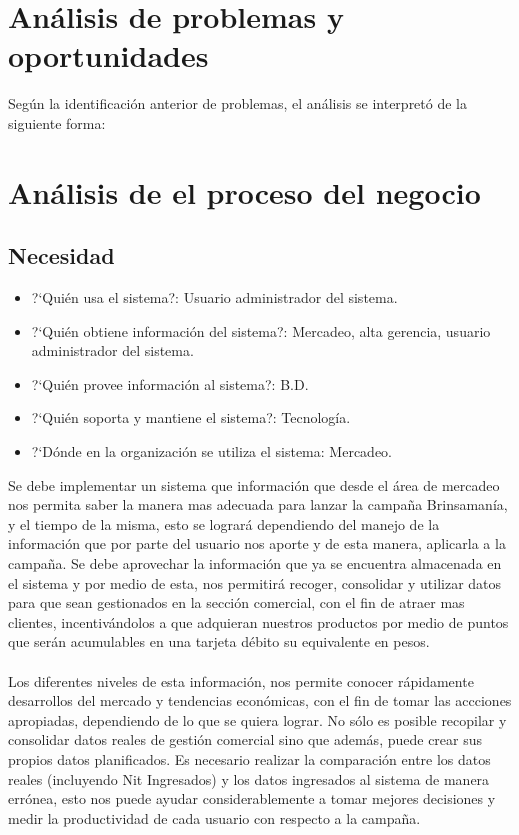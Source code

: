 \section{An\'alisis de problemas y oportunidades}
Seg\'un la identificaci\'on anterior de problemas, el an\'alisis se interpret\'o de la siguiente forma:%
%
%
\section{An\'alisis de el proceso del negocio}
\subsection{Necesidad}
\begin{itemize}
	\item ?`Qui\'en usa el sistema?: Usuario administrador del sistema.
	\item ?`Qui\'en obtiene informaci\'on del sistema?: Mercadeo, alta gerencia, usuario administrador del sistema.
	\item ?`Qui\'en provee informaci\'on al sistema?: B.D.
	\item ?`Qui\'en soporta y mantiene el sistema?: Tecnolog\'ia.
	\item ?`D\'onde en la organizaci\'on se utiliza el sistema: Mercadeo.
\end{itemize}%
%
Se debe implementar un sistema que informaci\'on que desde el \'area de mercadeo  nos permita saber la manera mas adecuada para lanzar la campa\~na Brinsaman\'ia, y el tiempo de la misma, esto se lograr\'a  dependiendo del manejo de la informaci\'on que  por parte del usuario nos aporte y de esta manera, aplicarla a la campa\~na. Se debe aprovechar la informaci\'on que ya se encuentra almacenada en el sistema y  por medio de esta, nos permitir\'a recoger, consolidar y utilizar datos para que sean gestionados en la secci\'on comercial, con el fin de atraer mas clientes, incentiv\'andolos a que adquieran nuestros productos por medio de puntos que ser\'an acumulables en una tarjeta d\'ebito su equivalente en pesos.%
\\%
\\%
Los diferentes niveles de esta informaci\'on, nos permite conocer r\'apidamente desarrollos del mercado y tendencias econ\'omicas, con el fin de tomar las accciones apropiadas, dependiendo de lo que se quiera lograr. No s\'olo es posible recopilar y consolidar datos reales de gesti\'on comercial sino que adem\'as, puede crear sus propios datos planificados. Es necesario realizar la comparaci\'on entre los datos reales (incluyendo Nit Ingresados) y los datos  ingresados al sistema de manera err\'onea, esto nos  puede ayudar considerablemente a tomar mejores decisiones y medir la productividad de cada usuario con respecto a la campa\~na.%
%
\newpage%
